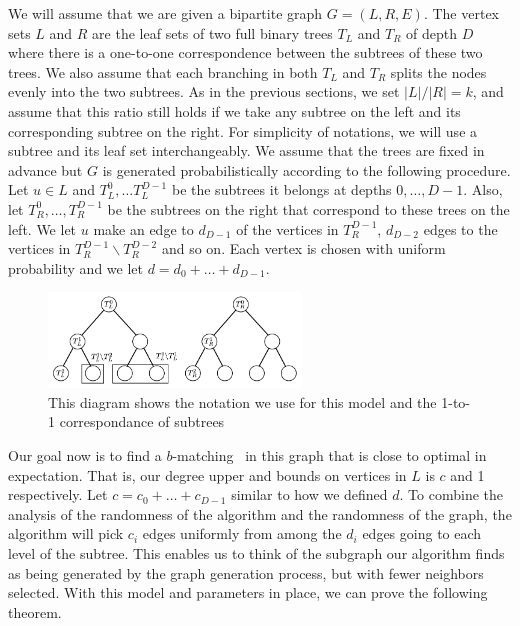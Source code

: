 We will assume that we are given a bipartite graph $G=(L,R,E)$. The vertex sets $L$
and $R$ are the leaf sets of two full binary trees $T_L$ and $T_R$ of
depth $D$ where there is a one-to-one correspondence between the
subtrees of these two trees. We also assume that each branching in
both $T_L$ and $T_R$ splits the nodes evenly into the two
subtrees. As in the previous sections, we set $|L|/|R|=k$, 
and assume that this ratio still holds if we take any subtree on the left 
and its corresponding subtree on the right. For simplicity of notations, we 
will use a subtree and its leaf set interchangeably. We assume that the trees are
fixed in advance but $G$ is generated probabilistically according to
the following procedure. Let $u\in L$ and $T_L^0, \ldots T^{D-1}_L$ be
the subtrees it belongs at depths $0,\ldots, D-1$. Also, let 
$T_R^0,\ldots, T_R^{D-1}$ be the subtrees on the right that correspond
to these trees on the left. We let $u$ make an edge to $d_{D-1}$ of
the vertices in $T_{R}^{D-1}$, $d_{D-2}$ edges to the vertices in 
$T_{R}^{D-1} \backslash T_{R}^{D-2}$ and so on. Each vertex is chosen
with uniform probability and we let $d = d_{0} + \ldots + d_{D-1}$.\vs

\begin{figure}[h]
\centering
\includegraphics[width=0.6\textwidth]{images/hierarchy_tree.png}
\begin{minipage}[h]{0.7\textwidth}
\caption{This diagram shows the notation we use for this model and the 1-to-1 correspondance of subtrees}
\end{minipage}
\end{figure}

Our goal now is to find a $b$-matching~\cite{Gabow1983} in this graph that is close to
optimal in expectation. That is, our degree upper and bounds on vertices in
$L$ is $c$ and 1 respectively. Let $c
= c_0 + \ldots + c_{D-1}$ similar to how we defined $d$. 
To combine the analysis of the randomness of the algorithm
and the randomness of the graph, the algorithm will pick $c_{i}$ edges
uniformly from among the $d_{i}$ edges going to each level of the
subtree. This enables us to think of the subgraph our algorithm
finds as being generated by the graph generation process, but with
fewer neighbors selected. With
this model and parameters in place, we can prove the following
theorem.\

